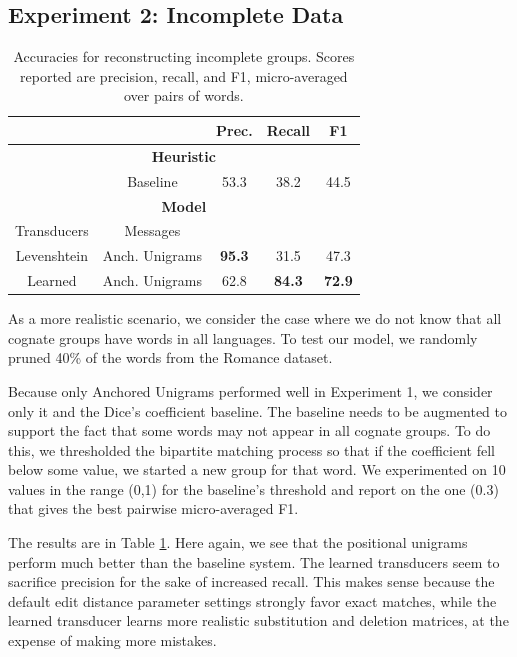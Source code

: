 \documentclass[11pt,a4paper]{article}
\begin{document}
\subsection{Experiment 2: Incomplete Data}

\begin{table}
  \small
  { 
  \begin{tabular}{|c|c|c|c|c|}
    \cline{3-5} 
    \multicolumn{2}{c|}{\textbf{}} & Prec. & Recall & F1 \\
    \hline 
    \multicolumn{5}{|c|}{\textbf{Heuristic}} \\
    \hline
    \multicolumn{1}{|c}{} & \multicolumn{1}{c|}{Baseline} & 53.3 & 38.2 & 44.5  \\
    \hline
    \hline
    \multicolumn{5}{|c|}{\textbf{Model}} \\
    \hline
    Transducers & Messages & \multicolumn{2}{c}{} \\
    \hline
    Levenshtein&Anch. Unigrams & \textbf{95.3} & 31.5 & 47.3\\
    Learned&Anch. Unigrams  & 62.8 & \textbf{84.3} & \textbf{72.9} \\
    \hline
  \end{tabular}
  \caption{Accuracies for reconstructing incomplete groups. Scores
  reported are precision, recall, and F1, micro-averaged over pairs of words.}
  \label{tbl:partial}
 }
\end{table}

As a more realistic scenario, we consider the case where we do not
know that all cognate groups have words in all languages. To test
our model, we randomly pruned 40\% of the words from the Romance
dataset.

Because only Anchored Unigrams performed well in Experiment 1, we
consider only it and the Dice's coefficient baseline. The baseline
needs to be augmented to support the fact that some words may not
appear in all cognate groups. To do this, we thresholded the bipartite
matching process so that if the coefficient fell below some value,
we started a new group for that word. We experimented on 10 values
in the range (0,1) for the baseline's threshold and report on the
one (0.3) that gives the best pairwise micro-averaged F1.

The results are in Table \ref{tbl:partial}. Here again, we see that
the positional unigrams perform much better than the baseline system.
The learned transducers seem to sacrifice precision for the sake
of increased recall. This makes sense because the default edit
distance parameter settings strongly favor exact matches, while the
learned transducer learns more realistic substitution and deletion
matrices, at the expense of making more mistakes.
\end{document}
